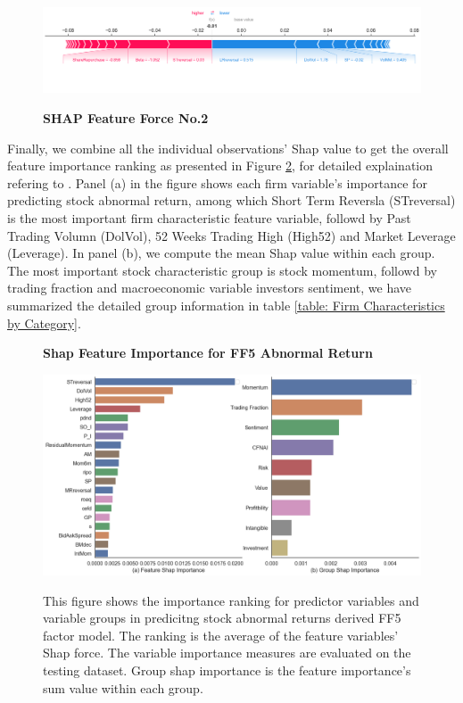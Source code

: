 \begin{figure}[H]
  \centering
  \caption{\textbf{SHAP Feature Force No.2}}
  \includegraphics[width=.8\textwidth]{images/4th_shap_feature_force.png}
  \label{fig: feature force 2nd}
\end{figure}

Finally, we combine all the individual observations' Shap value to get the overall feature importance ranking as presented in Figure \ref{fig: feature importance ff5 ab}, for detailed explaination refering to \citet*{lundberg2017unified}. Panel (a) in the figure shows each firm variable's importance for predicting stock abnormal return, among which Short Term Reversla (STreversal) is the most important firm characteristic feature variable, followd by Past Trading Volumn (DolVol), 52 Weeks Trading High (High52) and Market Leverage (Leverage). In panel (b), we compute the mean Shap value within each group. The most important stock characteristic group is stock momentum, followd by trading fraction and macroeconomic variable investors sentiment, we have summarized the detailed group information in table \ref{table: Firm Characteristics by Category}.

\begin{figure}[H]
  \centering
  \caption{\textbf{Shap Feature Importance for FF5 Abnormal Return}}
  \includegraphics[width=.8\textwidth]{images/shap_feature_importance_ff5.png}
  \label{fig: feature importance ff5 ab}
  \caption*{\footnotesize{This figure shows the importance ranking for predictor variables and variable groups in predicitng stock abnormal returns derived FF5 factor model. The ranking is the average of the feature variables' Shap force. The variable importance measures are evaluated on the testing dataset. Group shap importance is the feature importance's sum value within each group.}}
\end{figure}

